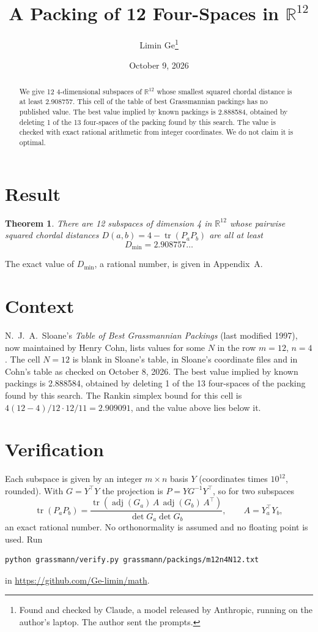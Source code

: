 \documentclass[11pt,a4paper]{article}
\title{A Packing of 12 Four-Spaces in $\mathbb{R}^{12}$}
\author{Limin Ge\thanks{Found and checked by Claude, a model released by Anthropic, running on the author's laptop. The author sent the prompts.}}
\date{October 9, 2026}
\newtheorem*{theorem}{Theorem}
\begin{document}
\maketitle
\begin{abstract}
We give 12 4-dimensional subspaces of $\mathbb{R}^{12}$ whose smallest squared chordal distance is at least 2.908757. This cell of the table of best Grassmannian packings has no published value. The best value implied by known packings is 2.888584, obtained by deleting 1 of the 13 four-spaces of the packing found by this search. The value is checked with exact rational arithmetic from integer coordinates. We do not claim it is optimal.
\end{abstract}

\section{Result}
\begin{theorem}
There are 12 subspaces of dimension 4 in $\mathbb{R}^{12}$ whose pairwise squared chordal distances $D(a,b) = 4 - \operatorname{tr}(P_aP_b)$ are all at least
\[ D_{\min} = 2.908757\ldots \]
\end{theorem}
The exact value of $D_{\min}$, a rational number, is given in Appendix~A.


\section{Context}
N.~J.~A.~Sloane's \emph{Table of Best Grassmannian Packings} (last modified 1997), now maintained by Henry Cohn, lists values for some $N$ in the row $m=12$, $n=4$. The cell $N=12$ is blank in Sloane's table, in Sloane's coordinate files and in Cohn's table as checked on October 8, 2026. The best value implied by known packings is 2.888584, obtained by deleting 1 of the 13 four-spaces of the packing found by this search. The Rankin simplex bound for this cell is $4(12-4)/12\cdot 12/11 = 2.909091$, and the value above lies below it.


\section{Verification}
Each subspace is given by an integer $m\times n$ basis $Y$ (coordinates times $10^{12}$, rounded). With $G=Y^\top Y$ the projection is $P=YG^{-1}Y^\top$, so for two subspaces
\[ \operatorname{tr}(P_aP_b)=\frac{\operatorname{tr}(\operatorname{adj}(G_a)\,A\,\operatorname{adj}(G_b)\,A^\top)}{\det G_a\det G_b},\qquad A=Y_a^\top Y_b, \]
an exact rational number. No orthonormality is assumed and no floating point is used. Run
\begin{verbatim}
python grassmann/verify.py grassmann/packings/m12n4N12.txt
\end{verbatim}
in \url{https://github.com/Ge-limin/math}.
\end{document}

